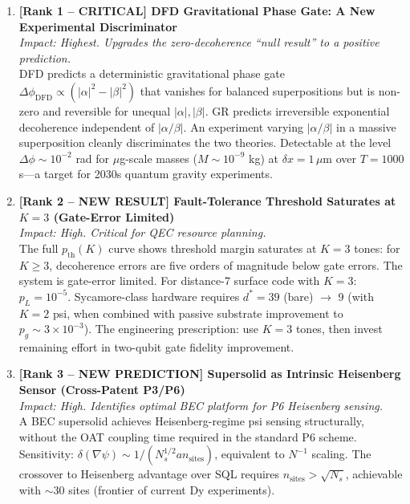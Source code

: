 \documentclass[11pt]{article}
\theoremstyle{definition}
\theoremstyle{remark}
\begin{document}
\begin{enumerate}

\item \textbf{[Rank 1 -- CRITICAL] DFD Gravitational Phase Gate: A New
Experimental Discriminator}\\
\textit{Impact: Highest. Upgrades the zero-decoherence ``null result'' to a
positive prediction.}\\
DFD predicts a deterministic gravitational phase gate $\Delta\phi_{\mathrm{DFD}}
\propto (|\alpha|^2 - |\beta|^2)$ that vanishes for balanced superpositions but
is non-zero and reversible for unequal $|\alpha|, |\beta|$.  GR predicts
irreversible exponential decoherence independent of $|\alpha/\beta|$.  An
experiment varying $|\alpha/\beta|$ in a massive superposition cleanly
discriminates the two theories.  Detectable at the level $\Delta\phi \sim
10^{-2}$ rad for $\mu$g-scale masses ($M \sim 10^{-9}$ kg) at $\delta x = 1\,\mu$m
over $T = 1000$ s---a target for 2030s quantum gravity experiments.

\item \textbf{[Rank 2 -- NEW RESULT] Fault-Tolerance Threshold Saturates at
$K = 3$ (Gate-Error Limited)}\\
\textit{Impact: High. Critical for QEC resource planning.}\\
The full $p_{\mathrm{th}}(K)$ curve shows threshold margin saturates at $K=3$
tones: for $K \geq 3$, decoherence errors are five orders of magnitude below
gate errors.  The system is gate-error limited.  For distance-7 surface code
with $K=3$: $p_L = 10^{-5}$.  Sycamore-class hardware requires $d^* = 39$
(bare) $\to$ 9 (with $K=2$ psi, when combined with passive substrate improvement
to $p_g \sim 3\times10^{-3}$).  The engineering prescription: use $K = 3$ tones,
then invest remaining effort in two-qubit gate fidelity improvement.

\item \textbf{[Rank 3 -- NEW PREDICTION] Supersolid as Intrinsic Heisenberg
Sensor (Cross-Patent P3/P6)}\\
\textit{Impact: High. Identifies optimal BEC platform for P6 Heisenberg sensing.}\\
A BEC supersolid achieves Heisenberg-regime psi sensing structurally, without
the OAT coupling time required in the standard P6 scheme.  Sensitivity:
$\delta(\nabla\psi) \sim 1/(N_s^{1/2} a n_{\mathrm{sites}})$, equivalent to
$N^{-1}$ scaling.  The crossover to Heisenberg advantage over SQL requires
$n_{\mathrm{sites}} > \sqrt{N_s}$, achievable with $\sim 30$ sites (frontier of
current Dy experiments).


\end{enumerate}
\end{document}
